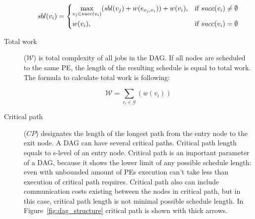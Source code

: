 \begin{description}
\[
sbl(v_i) =
  \begin{dcases}
    \max_{v_j \in succ(v_i)}(sbl(v_j) + w(e_{v_j,v_i})) + w(v_i),& \text{if } succ(v_i) \neq \emptyset\\
    w(v_i), & \text{if } succ(v_i) = \emptyset
  \end{dcases}
\]

\item[Total work] ($\mathcal{W}$) is total complexity of all jobs in
  the DAG. If all nodes are scheduled to the same PE, the length of
  the resulting schedule is equal to total work. The formula to
  calculate total work is following:

\[
\mathcal{W} = \sum_{v_i \in \mathcal{G}}(w(v_i))
\]

\item[Critical path] ($CP$) designates the length of the longest path
  from the entry node to the exit node. A DAG can have several
  critical paths. Critical path length equals to s-level of an entry
  node. Critical path is an important parameter of a DAG, because it
  shows the lower limit of any possible schedule length: even with
  unbounded amount of PEs execution can't take less than execution of
  critical path requires. Critical path also can include communication
  costs existing between the nodes in critical path, but in this case,
  critical path length is not minimal possible schedule length. In
  Figure~\ref{fig:dag_structure} critical path is shown with thick
  arrows.
\end{description}

